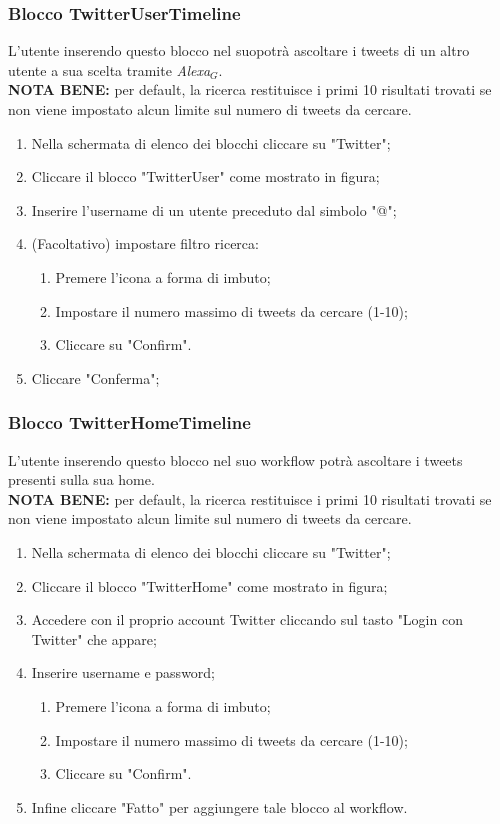 \subsubsection{Blocco TwitterUserTimeline} \label{twitterU}
L'utente inserendo questo blocco nel suopotrà ascoltare i tweets di un altro utente a sua scelta tramite \textit{Alexa$_{G}$}. \\
\textbf{NOTA BENE:} per default, la ricerca restituisce i primi 10 risultati trovati se non viene impostato alcun limite sul numero di tweets da cercare.
\begin{enumerate}
	\item Nella schermata di elenco dei blocchi cliccare su "Twitter";
	\item Cliccare il blocco "TwitterUser" come mostrato in figura;
	\item Inserire l'username di un utente preceduto dal simbolo "@";
	\item (Facoltativo) impostare filtro ricerca:
	\begin{enumerate}
		\item Premere l'icona a forma di imbuto;
		\item Impostare il numero massimo di tweets da cercare (1-10);
		\item Cliccare su "Confirm".
	\end{enumerate}
	\item Cliccare "Conferma";
\end{enumerate}

\subsubsection{Blocco TwitterHomeTimeline} \label{twitterHo}
L'utente inserendo questo blocco nel suo workflow potrà ascoltare i tweets presenti sulla sua home. \\
\textbf{NOTA BENE:} per default, la ricerca restituisce i primi 10 risultati trovati se non viene impostato alcun limite sul numero di tweets da cercare.
\begin{enumerate}
	\item Nella schermata di elenco dei blocchi cliccare su "Twitter";
	\item Cliccare il blocco "TwitterHome" come mostrato in figura;
	\item Accedere con il proprio account Twitter cliccando sul tasto
		"Login con Twitter" che appare;
	\item Inserire username e password;
	\begin{enumerate}
		\item Premere l'icona a forma di imbuto;
		\item Impostare il numero massimo di tweets da cercare (1-10);
		\item Cliccare su "Confirm".
	\end{enumerate}
	\item Infine cliccare "Fatto" per aggiungere tale blocco al workflow.
\end{enumerate}

